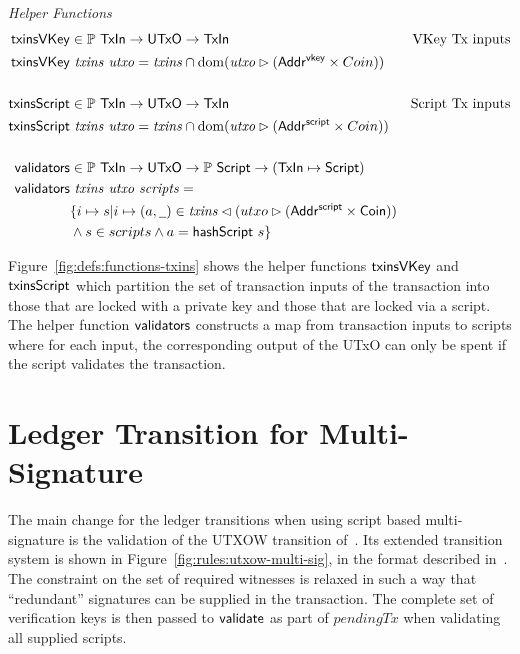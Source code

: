 \documentclass[11pt,a4paper,dvipsnames]{article}
\newcommand{\AddrVKey}{\type{Addr^{vkey}}}
\newcommand{\UTxO}{\type{UTxO}}
\newcommand{\Coin}{\type{Coin}}
\newcommand{\AddrScr}{\type{Addr^{script}}}
\newcommand{\Script}{\type{Script}}
\newcommand{\TxIn}{\type{TxIn}}
\newcommand{\wcard}[0]{\underline{\phantom{a}}}
\theoremstyle{definition}
\begin{document}
\begin{figure*}[htb]
  \emph{Helper Functions}
  \begin{align*}
    \fun{txinsVKey} & \in \powerset \TxIn \to \UTxO \to \TxIn & \text{VKey Tx inputs}\\
    \fun{txinsVKey} & ~\var{txins}~\var{utxo} =
    \var{txins} \cap \dom (\var{utxo} \restrictrange (\AddrVKey \times Coin))
    \\
    \\
    \fun{txinsScript} & \in \powerset \TxIn \to \UTxO \to \TxIn & \text{Script Tx inputs}\\
    \fun{txinsScript} & ~\var{txins}~\var{utxo} =
                        \var{txins} \cap \dom (\var{utxo} \restrictrange (\AddrScr \times Coin))
    \\
    \\
    \fun{validators} & \in \powerset\TxIn \to \UTxO \to \powerset \Script \to
                       (\TxIn \mapsto \Script) \\
    \fun{validators} &~\var{txins}~\var{utxo}~\var{scripts} = \\
                       & \{
                         i\mapsto s \vert
                         i\mapsto (a,\wcard) \in \var{txins}\restrictdom(utxo
                         \restrictrange (\AddrScr\times\Coin)) \\
                    &
                      \wedge s \in scripts
                      \wedge a = \fun{hashScript}~s
                      \}
  \end{align*}
  \caption{Helper Functions for Transaction Inputs}
  \label{fig:defs:functions-txins}
\end{figure*}

Figure~\ref{fig:defs:functions-txins} shows the helper functions
$\mathsf{txinsVKey}$ and $\mathsf{txinsScript}$ which partition the set of transaction
inputs of the transaction into those that are locked with a private key and
those that are locked via a script. The helper function $\mathsf{validators}$
constructs a map from transaction inputs to scripts where for each input, the
corresponding output of the UTxO can only be spent if the script validates the
transaction.

\section{Ledger Transition for Multi-Signature}
\label{sec:ledg-trans-multi}

The main change for the ledger transitions when using script based
multi-signature is the validation of the UTXOW transition
of~\cite{shelley_formal_spec}. Its extended transition system is shown in
Figure~\ref{fig:rules:utxow-multi-sig}, in the format described
in~\cite{small_step_semantics}. The constraint on the set of required witnesses
is relaxed in such a way that ``redundant'' signatures can be supplied in the
transaction. The complete set of verification keys is then passed to
$\mathsf{validate}$ as part of $pendingTx$ when validating all supplied scripts.
\end{document}
